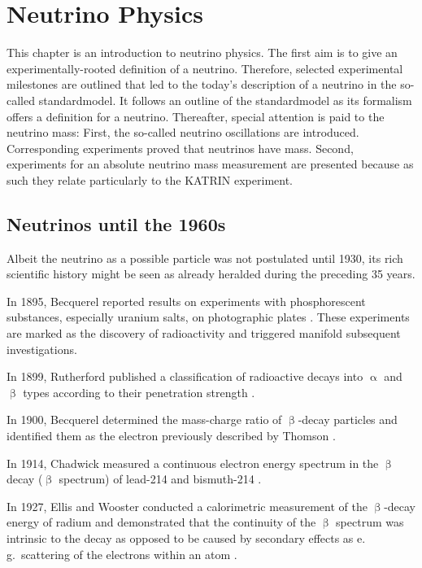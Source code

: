 
\chapter{Neutrino Physics}
This chapter is an introduction to neutrino physics. The first aim is to give an experimentally-rooted definition of a neutrino. Therefore, selected experimental milestones are outlined that led to the today's description of a neutrino in the so-called \gls{standardmodel}. It follows an outline of the \gls{standardmodel} as its formalism offers a definition for a neutrino. Thereafter, special attention is paid to the neutrino mass: First, the so-called neutrino oscillations are introduced. Corresponding experiments proved that neutrinos have mass. Second, experiments for an absolute neutrino mass measurement are presented because as such they relate particularly to the KATRIN experiment.

\section{Neutrinos until the 1960s}
Albeit the neutrino as a possible particle was not postulated until 1930, its rich scientific history might be seen as already heralded during the preceding 35 years. 

In 1895, Becquerel reported results on experiments with phosphorescent substances, especially uranium salts, on photographic plates \cite{Becquerel:1}. These experiments are marked as the discovery of radioactivity and triggered manifold subsequent investigations. 

In 1899, Rutherford published a classification of radioactive decays into $\upalpha$ and $\upbeta$ types according to their penetration strength \cite{Rutherford:1}. 

In 1900, Becquerel determined the mass-charge ratio of $\upbeta$-decay particles and identified them as the electron previously described by Thomson \cite{Becquerel:2} \cite{Thomson:1}. 

In 1914, Chadwick measured a continuous electron energy spectrum in the $\upbeta$ decay ($\upbeta$ spectrum) of lead-214 and bismuth-214 \cite{Chadwick:1}. 

In 1927, Ellis and Wooster conducted a calorimetric measurement of the $\upbeta$-decay energy of radium and demonstrated that the continuity of the $\upbeta$ spectrum was intrinsic to the decay as opposed to be caused by secondary effects as e.\,g.~scattering of the electrons within an atom \cite{Ellis:1}. 

